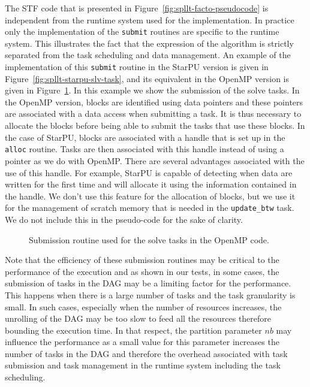 \documentclass{article}
\newcommand{\starpu}{{StarPU}\xspace}
\newcommand{\openmp}{OpenMP\xspace}
\begin{document}
The STF code that is presented in
Figure~\ref{fig:spllt-facto-pseudocode} is independent from the
runtime system used for the implementation. In practice only the
implementation of the \texttt{submit} routines are specific to the
runtime system. This illustrates the fact that the expression of the
algorithm is strictly separated from the task scheduling and data
management. An example of the implementation of this \texttt{submit}
routine in the \starpu version is given in
Figure~\ref{fig:spllt-starpu-slv-task}, and its equivalent in the
\openmp version is given in Figure~\ref{fig:spllt-omp-slv-task}. In
this example we show the submission of the solve tasks. In the \openmp
version, blocks are identified using data pointers and these pointers
are associated with a data access when submitting a task. It is thus
necessary to allocate the blocks before being able to submit the tasks
that use these blocks. In the case of \starpu, blocks are associated
with a handle that is set up in the \texttt{alloc} routine. Tasks are
then associated with this handle instead of using a pointer as we do
with \openmp. There are several advantages associated with the use of
this handle. For example, \starpu is capable of detecting when data
are written for the first time and will allocate it using the
information contained in the handle. We don't use this feature for the
allocation of blocks, but we use it for the management of scratch
memory that is needed in the \texttt{update\_btw} task. We do not
include this in the pseudo-code for the sake of clarity.

\begin{figure}[!h]
  \begin{minipage}{0.5\textwidth}
    \centering
    \lstset{basicstyle=\tt\scriptsize, language=C}
    
    \caption{\label{fig:spllt-starpu-slv-task} Submission routine used
      for the solve tasks in the \starpu code.}
  \end{minipage}
  \hspace{0.5cm}
  \begin{minipage}{0.5\textwidth}
    \centering
    \lstset{basicstyle=\tt\scriptsize}
    
    \caption{\label{fig:spllt-omp-slv-task}Submission routine used
      for the solve tasks in the \openmp code.}
  \end{minipage}
\end{figure}

Note that the efficiency of these submission routines may be critical
to the performance of the execution and as shown in our tests, in some
cases, the submission of tasks in the DAG may be a limiting factor for
the performance. This happens when there is a large number of tasks
and the task granularity is small. In such cases, especially when the
number of resources increases, the unrolling of the DAG may be too
slow to feed all the resources therefore bounding the execution
time. In that respect, the partition parameter $nb$ may influence the
performance as a small value for this parameter increases the number
of tasks in the DAG and therefore the overhead associated with
task submission and task management in the runtime system
including the task scheduling.
\end{document}

